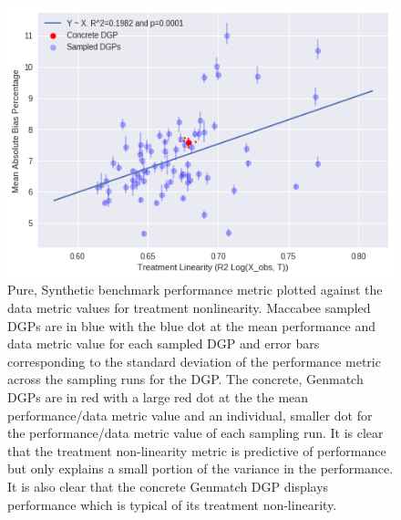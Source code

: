 \documentclass[../main.tex]{subfiles}
\begin{document}
\begin{figure}[ht!]
    \centering
    \includegraphics[width=1\linewidth]{figures/ch7-benchmark-pure-synth-2.png}
    \caption{Pure, Synthetic benchmark performance metric plotted against the data metric values for treatment nonlinearity. Maccabee sampled DGPs are in blue with the blue dot at the mean performance and data metric value for each sampled DGP and error bars corresponding to the standard deviation of the performance metric across the sampling runs for the DGP. The concrete, Genmatch DGPs are in red with a large red dot at the the mean performance/data metric value and an individual, smaller dot for the performance/data metric value of each sampling run. It is clear that the treatment non-linearity metric is predictive of performance but only explains a small portion of the variance in the performance. It is also clear that the concrete Genmatch DGP displays performance which is typical of its treatment non-linearity.}
    \label{fig:benchmark-validation-pure-synth-2}
\end{figure}
\FloatBarrier
\end{document}
